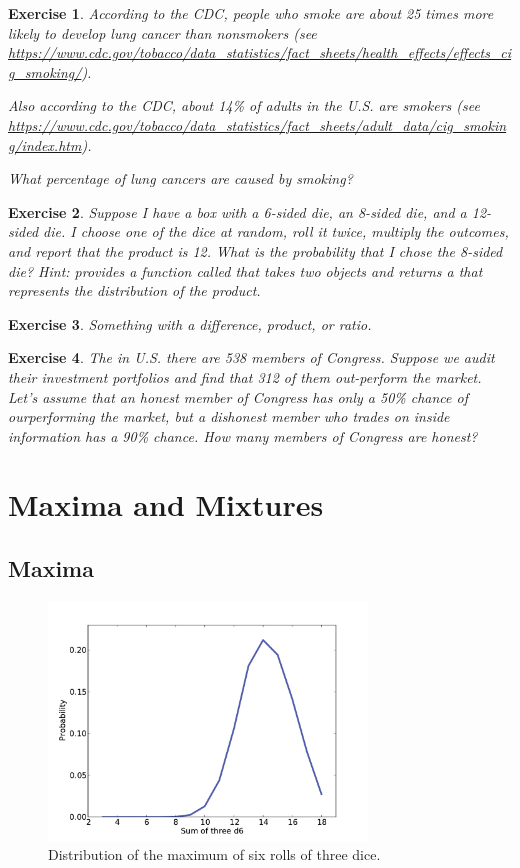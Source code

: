 \documentclass[12pt]{book}
\theoremstyle{exercise}
\newtheorem{exercise}{Exercise}[chapter]
\begin{document}
\begin{exercise}
According to the CDC, people who smoke are about 25 times more likely to develop lung cancer than nonsmokers (see \url{https://www.cdc.gov/tobacco/data_statistics/fact_sheets/health_effects/effects_cig_smoking/}).

Also according to the CDC, about 14\% of adults in the U.S. are smokers (see \url{https://www.cdc.gov/tobacco/data_statistics/fact_sheets/adult_data/cig_smoking/index.htm}). 

What percentage of lung cancers are caused by smoking?
\end{exercise}


\begin{exercise}
Suppose I have a box with a 6-sided die, an 8-sided die, and a 12-sided die.
I choose one of the dice at random, roll it twice, multiply the outcomes, and report that the product is 12.
What is the probability that I chose the 8-sided die?
Hint:  provides a function called  that takes two  objects and returns a  that represents the distribution of the product.
\end{exercise}


\begin{exercise}
Something with a difference, product, or ratio.
\end{exercise}


\begin{exercise}
The in U.S. there are 538 members of Congress.  Suppose we audit their investment portfolios and find that 312 of them out-perform the market.
Let's assume that an honest member of Congress has only a 50\% chance of ourperforming the market, but a dishonest member who trades on inside information has a 90\% chance.  How many members of Congress are honest?
\end{exercise}



\chapter{Maxima and Mixtures}

\section{Maxima}

\begin{figure}
\centerline{\includegraphics[height=2.5in]{figs/dungeons2.pdf}}
\caption{Distribution of the maximum of six rolls of three dice.}
\label{fig.dungeons2}
\end{figure}
\end{document}
